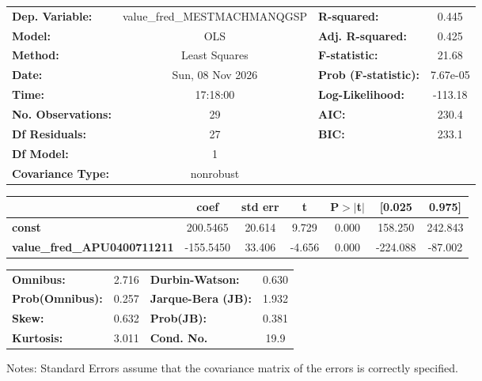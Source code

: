 \begin{center}
\begin{tabular}{lclc}
\toprule
\textbf{Dep. Variable:}             & value\_fred\_MESTMACHMANQGSP & \textbf{  R-squared:         } &     0.445   \\
\textbf{Model:}                     &             OLS              & \textbf{  Adj. R-squared:    } &     0.425   \\
\textbf{Method:}                    &        Least Squares         & \textbf{  F-statistic:       } &     21.68   \\
\textbf{Date:}                      &       Sun, 08 Nov 2026       & \textbf{  Prob (F-statistic):} &  7.67e-05   \\
\textbf{Time:}                      &           17:18:00           & \textbf{  Log-Likelihood:    } &   -113.18   \\
\textbf{No. Observations:}          &                29            & \textbf{  AIC:               } &     230.4   \\
\textbf{Df Residuals:}              &                27            & \textbf{  BIC:               } &     233.1   \\
\textbf{Df Model:}                  &                 1            & \textbf{                     } &             \\
\textbf{Covariance Type:}           &          nonrobust           & \textbf{                     } &             \\
\bottomrule
\end{tabular}
\begin{tabular}{lcccccc}
                                    & \textbf{coef} & \textbf{std err} & \textbf{t} & \textbf{P$> |$t$|$} & \textbf{[0.025} & \textbf{0.975]}  \\
\midrule
\textbf{const}                      &     200.5465  &       20.614     &     9.729  &         0.000        &      158.250    &      242.843     \\
\textbf{value\_fred\_APU0400711211} &    -155.5450  &       33.406     &    -4.656  &         0.000        &     -224.088    &      -87.002     \\
\bottomrule
\end{tabular}
\begin{tabular}{lclc}
\textbf{Omnibus:}       &  2.716 & \textbf{  Durbin-Watson:     } &    0.630  \\
\textbf{Prob(Omnibus):} &  0.257 & \textbf{  Jarque-Bera (JB):  } &    1.932  \\
\textbf{Skew:}          &  0.632 & \textbf{  Prob(JB):          } &    0.381  \\
\textbf{Kurtosis:}      &  3.011 & \textbf{  Cond. No.          } &     19.9  \\
\bottomrule
\end{tabular}
\end{center}

Notes: \newline
 [1] Standard Errors assume that the covariance matrix of the errors is correctly specified.